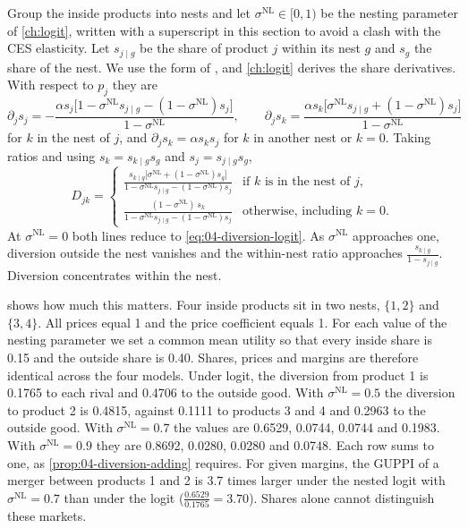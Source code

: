 Group the inside products into nests and let $\sigma^{\mathrm{NL}} \in [0,1)$ be the nesting parameter of
\cref{ch:logit}, written with a superscript in this section to avoid a clash with the CES elasticity. Let
$s_{j\mid g}$ be the share of product $j$ within its nest $g$ and $s_g$ the share of the nest. We use the form
of \citet{Berry1994}, and \cref{ch:logit} derives the share derivatives. With respect to $p_j$ they are
\[
  \partial_j s_j = -\frac{\alpha s_j\bigl[1 - \sigma^{\mathrm{NL}} s_{j\mid g} - (1 - \sigma^{\mathrm{NL}})s_j\bigr]}{1 - \sigma^{\mathrm{NL}}},
  \qquad
  \partial_j s_k = \frac{\alpha s_k\bigl[\sigma^{\mathrm{NL}} s_{j\mid g} + (1 - \sigma^{\mathrm{NL}})s_j\bigr]}{1 - \sigma^{\mathrm{NL}}}
\]
for $k$ in the nest of $j$, and $\partial_j s_k = \alpha s_k s_j$ for $k$ in another nest or $k = 0$. Taking ratios
and using $s_k = s_{k\mid g}s_g$ and $s_j = s_{j\mid g}s_g$,
\begin{equation}\label{eq:04-diversion-nl}
  D_{jk} =
  \begin{cases}
    \displaystyle\frac{s_{k\mid g}\bigl[\sigma^{\mathrm{NL}} + (1 - \sigma^{\mathrm{NL}})s_g\bigr]}{1 - \sigma^{\mathrm{NL}}s_{j\mid g} - (1 - \sigma^{\mathrm{NL}})s_j} & \text{if $k$ is in the nest of $j$,}\\[3ex]
    \displaystyle\frac{(1 - \sigma^{\mathrm{NL}})\,s_k}{1 - \sigma^{\mathrm{NL}}s_{j\mid g} - (1 - \sigma^{\mathrm{NL}})s_j} & \text{otherwise, including $k = 0$.}
  \end{cases}
\end{equation}
At $\sigma^{\mathrm{NL}} = 0$ both lines reduce to \eqref{eq:04-diversion-logit}. As
$\sigma^{\mathrm{NL}}$ approaches one, diversion outside the nest vanishes and the within-nest ratio approaches
$\frac{s_{k\mid g}}{1 - s_{j\mid g}}$. Diversion concentrates within the nest.

 shows how much this matters. Four inside products sit in two nests, $\{1, 2\}$ and
$\{3, 4\}$. All prices equal 1 and the price coefficient equals 1. For each value of the nesting parameter we
set a common mean utility so that every inside share is 0.15 and the outside share is 0.40. Shares, prices and
margins are therefore identical across the four models. Under logit, the diversion from product 1 is 0.1765 to
each rival and 0.4706 to the outside good. With $\sigma^{\mathrm{NL}} = 0.5$ the diversion to product 2 is
0.4815, against 0.1111 to products 3 and 4 and 0.2963 to the outside good. With $\sigma^{\mathrm{NL}} = 0.7$ the
values are 0.6529, 0.0744, 0.0744 and 0.1983. With $\sigma^{\mathrm{NL}} = 0.9$ they are 0.8692, 0.0280, 0.0280
and 0.0748. Each row sums to one, as \cref{prop:04-diversion-adding} requires. For given margins, the GUPPI of a
merger between products 1 and 2 is 3.7 times larger under the nested logit with $\sigma^{\mathrm{NL}} = 0.7$
than under the logit ($\frac{0.6529}{0.1765} = 3.70$). Shares alone cannot distinguish these markets.

